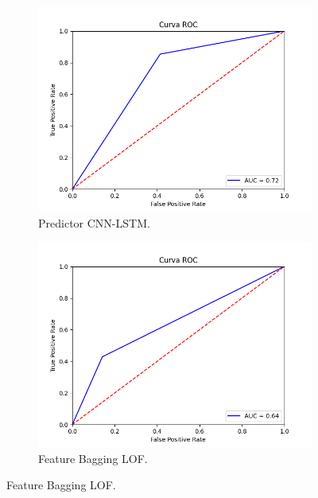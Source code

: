 \begin{figure}[H]
	\centering
	\begin{subfigure}{.49\textwidth}
		\centering
		\includegraphics[scale=0.42]{imagenes/roc/Predictor-CNN-LSTM_roc.png}
		\caption{Predictor CNN-LSTM.}
	\end{subfigure}
	\begin{subfigure}{.49\textwidth}
		\centering
		\includegraphics[scale=0.42]{imagenes/roc/Feature-Bagging-LOF_roc.png}
		\caption{Feature Bagging LOF.}
	\end{subfigure}
	\label{img:roc3}
\end{figure}

